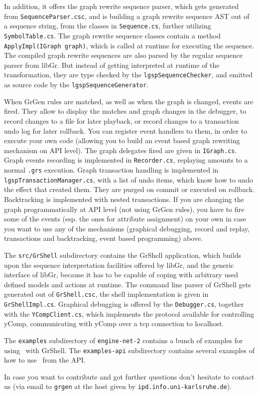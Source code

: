 In addition, it offers the graph rewrite sequence parser, which gets generated from \texttt{Sequence\-Parser.csc},
and is building a graph rewrite sequence AST out of a sequence string, from the classes in \texttt{Sequence.cs}, further utilizing \texttt{Symbol\-Table.cs}.
The graph rewrite sequence classes contain a method \texttt{ApplyImpl(IGraph graph)}, which is called at runtime for executing the sequence.
The compiled graph rewrite sequences are also parsed by the regular sequence parser from libGr. 
But instead of getting interpreted at runtime of the transformation, they are type checked by the \texttt{lgsp\-Sequence\-Checker}, and emitted as source code by the \texttt{lgsp\-Sequence\-Generator}.

When GrGen rules are matched, as well as when the graph is changed, events are fired.
They allow to display the matches and graph changes in the debugger,
to record changes to a file for later playback, or record changes to a transaction undo log for later rollback.
You can register event handlers to them, in order to execute your own code (allowing you to build an event based graph rewriting mechanism on API level).
The graph delegates fired are given in \texttt{IGraph.cs}.
Graph events recording is implemented in \texttt{Recorder.cs}, replaying amounts to a normal \texttt{.grs} execution.
Graph transaction handling is implemented in \texttt{lgspTransactionManager.cs}, with a list of undo items, which know how to undo the effect that created them.
They are purged on commit or executed on rollback.
Backtracking is implemented with nested transactions.
If you are changing the graph programmatically at API level (not using GrGen rules), you have to fire some of the events (esp. the ones for attribute assignment) on your own in case you want to use any of the mechanisms (graphical debugging, record and replay, transactions and backtracking, event based programming) above.

The \texttt{src/GrShell} subdirectory contains the GrShell application, which builds upon the sequence interpretation facilities offered by libGr, and the generic interface of libGr, because it has to be capable of coping with arbitrary used defined models and actions at runtime.
The command line parser of GrShell gets generated out of \texttt{GrShell.csc}, the shell implementation is given in \texttt{GrShellImpl.cs}.
Graphical debugging is offered by the \texttt{Debugger.cs}, together with the \texttt{YCompClient.cs}, which implements the protocol available for controlling yComp, communicating with yComp over a tcp connection to localhost.

The \texttt{examples} subdirectory of \texttt{engine-net-2} contains a bunch of examples for using \GrG~with GrShell.
The \texttt{examples-api} subdirectory contains several examples of how to use \GrG~from the API.

In case you want to contribute and got further questions don't hesitate to contact us 
(via email to \texttt{grgen} at the host given by \texttt{ipd.info.uni-karlsruhe.de}).


